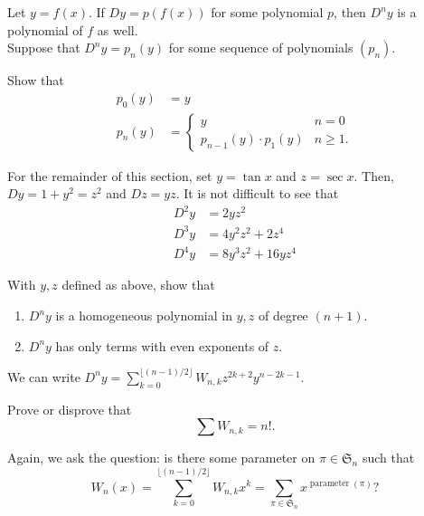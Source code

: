
	Let $y = f(x)$. If $Dy = p(f(x))$ for some polynomial $p$, then $D^ny$ is a polynomial of $f$ as well.\\
	Suppose that $D^ny = p_n(y)$ for some sequence of polynomials $(p_n)$.
	\begin{exercise}
		Show that
		\begin{align*}
			p_0(y) &= y \\
			p_n(y) &= \begin{cases} y & n=0 \\ p_{n-1}(y) \cdot p_1(y) & n \ge 1. \end{cases}
		\end{align*}
	\end{exercise}

	For the remainder of this section, set $y = \tan x$ and $z = \sec x$. Then, $Dy = 1+y^2 = z^2$ and $Dz = yz$. It is not difficult to see that
	\begin{align*}
		D^2y &= 2yz^2 \\
		D^3y &= 4y^2z^2 + 2z^4 \\
		D^4y &= 8y^3z^2 + 16yz^4
	\end{align*}

	\begin{exercise}
		With $y,z$ defined as above, show that
		\begin{enumerate}
			\item $D^ny$ is a homogeneous polynomial in $y,z$ of degree $(n+1)$.
			\item $D^ny$ has only terms with even exponents of $z$.
		\end{enumerate}
	\end{exercise}

	\begin{fcor}
		We can write $D^ny = \sum_{k=0}^{\lfloor (n-1)/2 \rfloor} W_{n,k} z^{2k+2} y^{n-2k-1}$.
	\end{fcor}

	\begin{exercise}
		Prove or disprove that
		\[ \sum W_{n,k} = n!. \]
	\end{exercise}
	Again, we ask the question: is there some parameter on $\pi \in \mathfrak{S}_n$ such that
	\[ W_n(x) = \sum_{k = 0}^{\lfloor (n-1)/2 \rfloor} W_{n,k} x^k = \sum_{\pi \in \mathfrak{S}_n} x^{\operatorname{parameter}(\pi)}? \]

